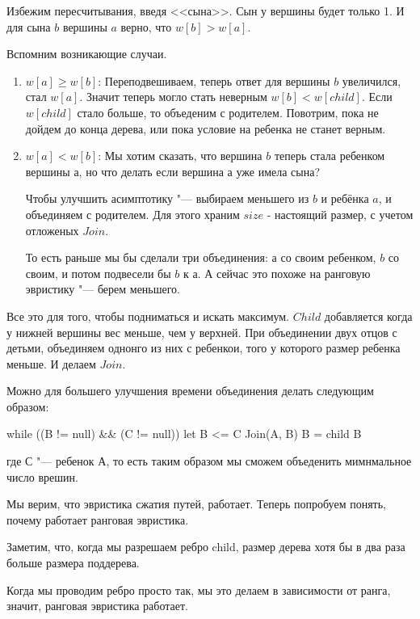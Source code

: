 
Избежим пересчитывания, введя <<сына>>. Сын у вершины будет только 1. И для сына $b$ вершины $a$ верно, что $w[b] > w[a]$.

Вспомним возникающие случаи.

\begin{enumerate}
\item
	$w[a] \ge w[b]$:
	Переподвешиваем, теперь ответ для вершины $b$ увеличился, стал $w[a]$.
	Значит теперь могло стать неверным $w[b] < w[child]$.
	Если $w[child]$ стало больше, то объеденим с родителем.
	Повотрим, пока не дойдем до конца дерева, или пока условие на ребенка не станет верным.

\item
	$w[a] < w[b]$:
	Мы хотим сказать, что вершина $b$ теперь стала ребенком вершины $а$, но что делать если вершина $а$ уже имела сына?


	Чтобы улучшить асимптотику "--- выбираем меньшего из $b$ и ребёнка $a$, и объединяем с родителем.
	Для этого храним $size$ - настоящий размер, с учетом отложеных $Join$.
\begin{cppcode}
Merge(a, b) { // допустим b меньше ребенка a.
    DSU.parent[b] = a; //сливаем a и b.
    Merge(a, child[b]); //сливаем a с ребенком b.
\end{cppcode}
	
	То есть раньше мы бы сделали три объединения: $а$ со своим ребенком, $b$ со своим, и потом подвесели бы $b$ к а.
	А сейчас это похоже на ранговую эвристику "--- берем меньшего.
\end{enumerate}

\begin{Rem}
	Все это для того, чтобы подниматься и искать максимум.
	$Child$ добавляется когда у нижней вершины вес меньше, чем у верхней.
	При объединении двух отцов с детьми, объединяем однонго из них с ребенкои, того у которого размер ребенка меньше. И делаем $Join$.


	Можно для большего улучшения времени объединения делать следующим образом:
\begin{cppcode}
while ((B != null) && (C != null))
	let B <= C
	Join(A, B)
	B = child B
\end{cppcode}
	где $С$ "--- ребенок $А$, то есть таким образом мы сможем объеденить мимнмальное число врешин.
\end{Rem}


Мы верим, что эвристика сжатия путей, работает. Теперь попробуем понять, почему работает ранговая эвристика. 

Заметим, что, когда мы разрешаем ребро child, размер дерева хотя бы в два раза больше размера поддерева. 

Когда мы проводим ребро просто так, мы это делаем в зависимости от ранга, значит, ранговая эвристика работает. 

